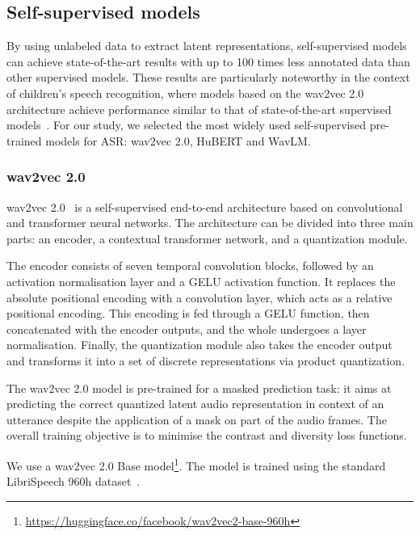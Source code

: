 \documentclass{Interspeech2024}
\begin{document}
\subsection{Self-supervised models}
By using unlabeled data to extract latent representations, self-supervised models can achieve state-of-the-art results with up to 100 times less annotated data than other supervised models.
These results are particularly noteworthy in the context of children's speech recognition, where models based on the wav2vec 2.0~\cite{baevski2020-wav2vec} architecture achieve performance similar to that of state-of-the-art supervised models~\cite{Jain2023-AWB}.
For our study, we selected the most widely used self-supervised pre-trained models for ASR: wav2vec 2.0, HuBERT and WavLM.

\subsubsection{wav2vec 2.0}
wav2vec 2.0~\cite{baevski2020-wav2vec} is a self-supervised end-to-end architecture based on convolutional and transformer neural networks. The architecture can be divided into three main parts: an encoder, a contextual transformer network, and a quantization module.

The encoder consists of seven temporal convolution blocks, followed by an activation normalisation layer and a GELU activation function. It replaces the absolute positional encoding with a convolution layer, which acts as a relative positional encoding. This encoding is fed through a GELU function, then concatenated with the encoder outputs, and the whole undergoes a layer normalisation. 
Finally, the quantization module also takes the encoder output and transforms it into a set of discrete representations via product quantization.

The wav2vec 2.0 model is pre-trained for a masked prediction task: it aims at predicting the correct quantized latent audio representation in context of an utterance despite the application of a mask on part of the audio frames.
The overall training objective is to minimise the contrast and diversity loss functions.

We use a wav2vec 2.0 Base model\footnote{\scriptsize\url{https://huggingface.co/facebook/wav2vec2-base-960h}}. The model is trained using the standard LibriSpeech 960h dataset~\cite{Panayotov2015-LiSp}.
\end{document}
